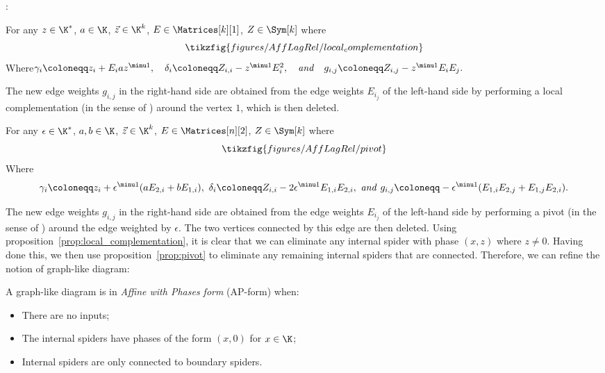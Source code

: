\textcite{backens_zx-calculus_2014, duncan_graph-theoretic_2020, booth_complete_2022, poor_qupit_2023}:
\begin{proposition}
  \label{prop:local_complementation}
  For any \(z \in \K^*\), \(a \in \K\), \(\vec{z}
  \in \K^k\), \(E \in \Matrices[k][1]\), \(Z \in \Sym[k]\) where
  \begin{equation*}
    \tikzfig{figures/AffLagRel/local_complementation}
  \end{equation*}
  Where\hfil \(\gamma_i \coloneqq z_i + E_i a z^{\minu 1},\quad \delta_i \coloneqq Z_{i,i} - z^{\minu 1} E_i^2,\quad{\it and}\quad g_{i,j} \coloneqq Z_{i, j} - z^{\minu 1} E_i E_j.\)
\end{proposition}
The new edge weights \(g_{i,j}\) in the right-hand side are obtained from
the edge weights \(E_{i_j}\) of the left-hand side by performing a local
complementation (in the sense of \textcite{kante_rank-width_2013}) around the
vertex \(1\), which is then deleted.
\begin{proposition}[Pivoting]
  \label{prop:pivot}
  For any \(\epsilon \in \K^*\), \(a,b \in \K\), \(\vec{z}
  \in \K^k\), \(E \in \Matrices[n][2]\), \(Z \in \Sym[k]\) where
  \begin{equation*}
    \tikzfig{figures/AffLagRel/pivot}
  \end{equation*}
  Where 
\[\gamma_i \coloneqq z_i + \epsilon^{\minu 1} (a E_{2,i} + b E_{1,i}),\  \delta_i \coloneqq Z_{i,i} - 2 \epsilon^{\minu 1} E_{1,i} E_{2,i},\  {\it and}\  g_{i,j} \coloneqq - \epsilon^{\minu 1} (E_{1,i} E_{2,j} + E_{1,j} E_{2,i}).\]
\end{proposition}
The new edge weights \(g_{i,j}\) in the right-hand side are obtained from
the edge weights \(E_{i_j}\) of the left-hand side by performing a pivot
(in the sense of \textcite{kante_rank-width_2013}) around the edge weighted
by \(\epsilon\). The two vertices connected by this edge are then deleted.
Using proposition~\ref{prop:local_complementation}, it is clear that we can
eliminate any internal spider with phase \((x,z)\) where \(z \neq 0\). Having
done this, we then use proposition~\ref{prop:pivot} to eliminate any
remaining internal spiders that are connected. Therefore, we can refine
 the notion of graph-like diagram:
\begin{definition}
A graph-like diagram is in \emph{Affine with Phases form}
  (AP-form) when:
  \begin{itemize}
    \item There are no inputs;
    \item The internal spiders have phases of the form \((x,0)\) for \(x \in \K\);
    \item Internal spiders are only connected to boundary spiders.
  \end{itemize}
\end{definition}
